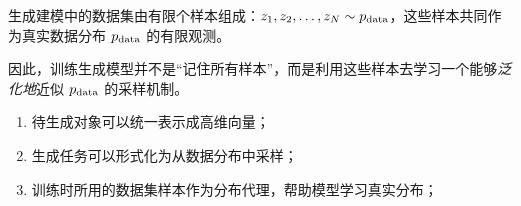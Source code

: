 \begin{definition}[经验样本]
生成建模中的数据集由有限个样本组成：$z_1,z_2,\ldots,z_N \sim p_{\mathrm{data}}$，这些样本共同作为真实数据分布 $p_{\mathrm{data}}$ 的有限观测。
\end{definition}

因此，训练生成模型并不是“记住所有样本”，而是利用这些样本去学习一个能够\emph{泛化地}近似 $p_{\mathrm{data}}$ 的采样机制。


\begin{summarybox}
\begin{enumerate}
  \item 待生成对象可以统一表示成高维向量；
  \item 生成任务可以形式化为从数据分布中采样；
  \item 训练时所用的数据集样本作为分布代理，帮助模型学习真实分布；
\end{enumerate}

\end{summarybox}
